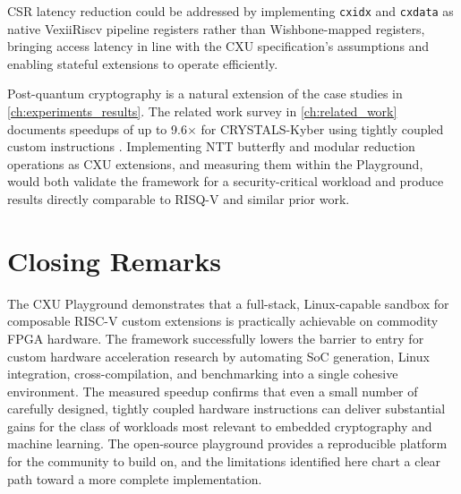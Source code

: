 CSR latency reduction could be addressed by implementing \texttt{cxidx}
and \texttt{cxdata} as native VexiiRiscv pipeline registers rather than
Wishbone-mapped registers, bringing access latency in line with the CXU
specification's assumptions and enabling stateful extensions to operate efficiently.

Post-quantum cryptography is a natural extension of the case studies in
\autoref{ch:experiments_results}. The related work survey in \autoref{ch:related_work} documents speedups of up to
9.6$\times$ for CRYSTALS-Kyber using tightly coupled custom instructions
\cite{Levi2020RISQV}. Implementing NTT butterfly and modular reduction operations
as CXU extensions, and measuring them within the Playground, would both validate
the framework for a security-critical workload and produce results directly
comparable to RISQ-V and similar prior work.


\section{Closing Remarks}
\label{sec:closing}

The CXU Playground demonstrates that a full-stack, Linux-capable sandbox for
composable RISC-V custom extensions is practically achievable on commodity FPGA
hardware. The framework successfully lowers the barrier to entry for custom
hardware acceleration research by automating SoC generation, Linux integration,
cross-compilation, and benchmarking into a single cohesive environment. The
measured
speedup confirms that even a small number of carefully
designed, tightly coupled hardware instructions can deliver substantial gains for
the class of workloads most relevant to embedded cryptography and machine learning.
The open-source playground provides a reproducible platform for the community to
build on, and the limitations identified here chart a clear path toward a more
complete implementation.
